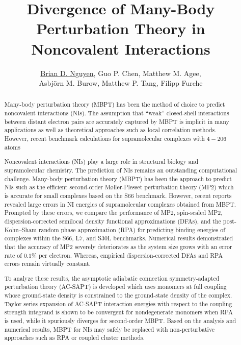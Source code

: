 \documentclass[12pt]{article}
\title{Divergence of Many-Body Perturbation Theory in Noncovalent Interactions}
\author{\underline{Brian D. Nguyen},
  Guo P. Chen, Matthew M. Agee, \\ Asbj{\"o}rn M. Burow,
  Matthew P. Tang,
  Filipp Furche}
\begin{document}
\maketitle

\begin{abstract}
  Many-body perturbation theory (MBPT) has been the method of choice to
  predict noncovalent interactions (NIs). The assumption that ``weak''
  closed-shell interactions between distant electron pairs are accurately
  captured by MBPT is implicit in many applications as well as theoretical
  approaches such as local correlation methods. However, recent benchmark
  calculations for supramolecular complexes with $4-206$ atoms 
  
  Noncovalent interactions (NIs) play a large role in structural biology
  and supramolecular chemistry. The prediction of NIs remains an outstanding
  computational challenge. Many-body perturbation theory (MBPT) has been the
  approach to predict NIs such as the efficient second-order M{\o}ller-Plesset
  perturbation theory (MP2) which is accurate for small complexes
  based on the S66 benchmark. However, recent reports revealed large errors
  in NI energies of supramolecular complexes obtained from MBPT.
  Prompted by these errors, we compare the performance of MP2, spin-scaled MP2,
  dispersion-corrected semilocal density functional approximations (DFAs),
  and the post-Kohn--Sham random phase approximation (RPA) for predicting binding
  energies of complexes within the S66, L7, and S30L benchmarks. Numerical
  results demonstrated that the accuracy of MP2 severely deteriorates as
  the system size grows with an error rate of $0.1\%$ per electron.
  Whereas, empirical dispersion-corrected DFAs and RPA errors remain virtually
  constant.

  To analyze these results, the asymptotic adiabatic connection
  symmetry-adapted perturbation theory (AC-SAPT) is developed which uses
  monomers at full coupling whose ground-state density is constrained to
  the ground-state density of the complex. Taylor series expansion of AC-SAPT
  interaction energies with respect to the coupling strength integrand is
  shown to be convergent for nondegenerate monomers when RPA is used, while it
  spuriously diverges for second-order MBPT. Based on the analysis and numerical
  results, MBPT for NIs may safely be replaced with non-perturbative approaches
  such as RPA or coupled cluster methods.

\end{abstract}
\end{document}
